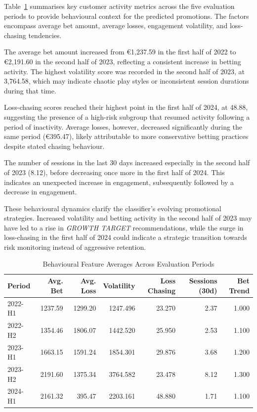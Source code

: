 \documentclass[12pt,a4paper]{report}
\begin{document}
Table~\ref{tab:behavioural_stats_by_period} summarises key customer activity metrics across the five evaluation periods to provide behavioural context for the predicted promotions. The factors encompass average bet amount, average losses, engagement volatility, and loss-chasing tendencies.

The average bet amount increased from €1,237.59 in the first half of 2022 to €2,191.60 in the second half of 2023, reflecting a consistent increase in betting activity. The highest volatility score was recorded in the second half of 2023, at 3,764.58, which may indicate chaotic play styles or inconsistent session durations during that time.

Loss-chasing scores reached their highest point in the first half of 2024, at 48.88, suggesting the presence of a high-risk subgroup that resumed activity following a period of inactivity. Average losses, however, decreased significantly during the same period (€395.47), likely attributable to more conservative betting practices despite stated chasing behaviour.

The number of sessions in the last 30 days increased especially in the second half of 2023 (8.12), before decreasing once more in the first half of 2024. This indicates an unexpected increase in engagement, subsequently followed by a decrease in engagement.

These behavioural dynamics clarify the classifier's evolving promotional strategies. Increased volatility and betting activity in the second half of 2023 may have led to a rise in \textit{GROWTH TARGET} recommendations, while the surge in loss-chasing in the first half of 2024 could indicate a strategic transition towards risk monitoring instead of aggressive retention.

\begin{table}[H]
\centering
\caption{Behavioural Feature Averages Across Evaluation Periods}
\label{tab:behavioural_stats_by_period}
\begin{tabular}{lrrrrrr}
\toprule
\textbf{Period} & \textbf{Avg. Bet} & \textbf{Avg. Loss} & \textbf{Volatility} & \textbf{Loss Chasing} & \textbf{Sessions (30d)} & \textbf{Bet Trend} \\
\midrule
2022-H1 & 1237.59 & 1299.20 & 1247.496 & 23.270 & 2.37 & 1.000 \\
2022-H2 & 1354.46 & 1806.07 & 1442.520 & 25.950 & 2.53 & 1.100 \\
2023-H1 & 1663.15 & 1591.24 & 1854.301 & 29.876 & 3.68 & 1.200 \\
2023-H2 & 2191.60 & 1375.34 & 3764.582 & 23.478 & 8.12 & 1.300 \\
2024-H1 & 2161.32 & 395.47  & 2203.161 & 48.880 & 1.71 & 1.100 \\
\bottomrule
\end{tabular}
\end{table}
\end{document}
